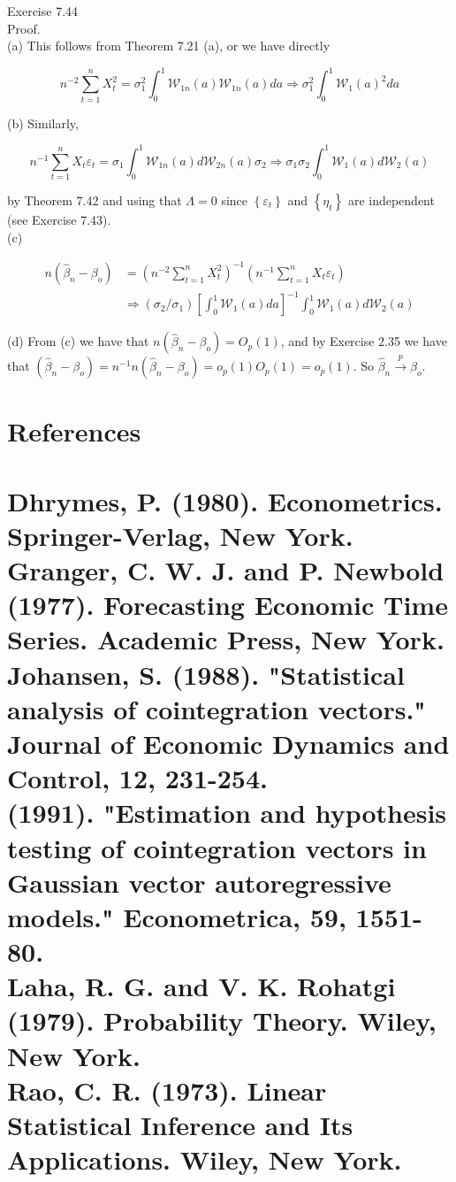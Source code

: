 \documentclass[10pt]{article}
\begin{document}
Exercise 7.44\\
Proof.\\
(a) This follows from Theorem 7.21 (a), or we have directly

$$
n^{-2} \sum_{t=1}^{n} X_{t}^{2}=\sigma_{1}^{2} \int_{0}^{1} \mathcal{W}_{1 n}(a) \mathcal{W}_{1 n}(a) d a \Rightarrow \sigma_{1}^{2} \int_{0}^{1} \mathcal{W}_{1}(a)^{2} d a
$$

(b) Similarly,

$$
n^{-1} \sum_{t=1}^{n} X_{t} \varepsilon_{t}=\sigma_{1} \int_{0}^{1} \mathcal{W}_{1 n}(a) d \mathcal{W}_{2 n}(a) \sigma_{2} \Rightarrow \sigma_{1} \sigma_{2} \int_{0}^{1} \mathcal{W}_{1}(a) d \mathcal{W}_{2}(a)
$$

by Theorem 7.42 and using that $\Lambda=0$ since $\left\{\varepsilon_{t}\right\}$ and $\left\{\eta_{t}\right\}$ are independent (see Exercise 7.43).\\
(c)

$$
\begin{aligned}
n\left(\hat{\beta}_{n}-\beta_{o}\right) & =\left(n^{-2} \sum_{t=1}^{n} X_{t}^{2}\right)^{-1}\left(n^{-1} \sum_{t=1}^{n} X_{t} \varepsilon_{t}\right) \\
& \Rightarrow\left(\sigma_{2} / \sigma_{1}\right)\left[\int_{0}^{1} \mathcal{W}_{1}(a) d a\right]^{-1} \int_{0}^{1} \mathcal{W}_{1}(a) d \mathcal{W}_{2}(a)
\end{aligned}
$$

(d) From (c) we have that $n\left(\hat{\beta}_{n}-\beta_{o}\right)=O_{p}(1)$, and by Exercise 2.35 we have that $\left(\hat{\beta}_{n}-\beta_{o}\right)=n^{-1} n\left(\hat{\beta}_{n}-\beta_{o}\right)=o_{p}(1) O_{p}(1)=o_{p}(1)$. So $\hat{\beta}_{n} \xrightarrow{p} \beta_{o}$.

\section*{References}
\section*{Dhrymes, P. (1980). Econometrics. Springer-Verlag, New York.\\
Granger, C. W. J. and P. Newbold (1977). Forecasting Economic Time Series. Academic Press, New York.\\
Johansen, S. (1988). "Statistical analysis of cointegration vectors." Journal of Economic Dynamics and Control, 12, 231-254.\\
(1991). "Estimation and hypothesis testing of cointegration vectors in Gaussian vector autoregressive models." Econometrica, 59, 1551-80.\\
Laha, R. G. and V. K. Rohatgi (1979). Probability Theory. Wiley, New York.\\
Rao, C. R. (1973). Linear Statistical Inference and Its Applications. Wiley, New York.}
\end{document}
